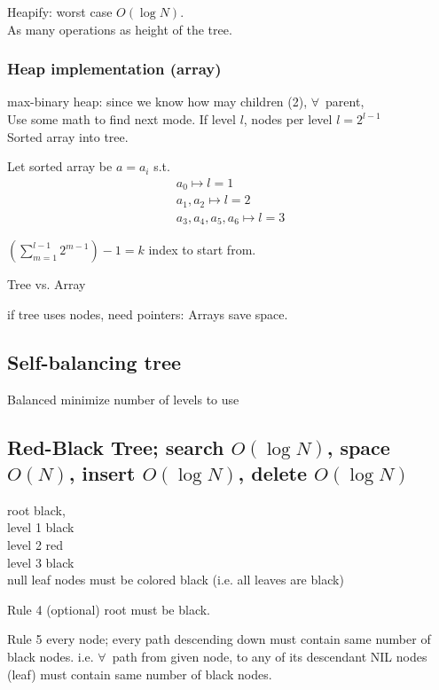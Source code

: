 \documentclass[10pt]{amsart}
\begin{document}
Heapify: worst case $O(\log{N})$. \\
As many operations as height of the tree.

\subsubsection{Heap implementation (array)}

max-binary heap: since we know how may children (2), $\forall \, $ parent, \\
Use some math to find next mode. If level $l$, nodes per level $l= 2^{l-1}$ \\
Sorted array into tree.

Let sorted array be $a=a_i$ s.t. 
\[
\begin{gathered} 
a_0 \mapsto l = 1\\ 
a_1, a_2 \mapsto l = 2 \\ 
a_3, a_4, a_5, a_6 \mapsto l = 3 
\end{gathered} 
\]

$\left(\sum_{m=1}^{l-1} 2^{m-1} \right) - 1 = k$ index to start from. 

Tree vs. Array

if tree uses nodes, need pointers: Arrays save space. 

\subsection{Self-balancing tree}

Balanced minimize number of levels to use

\subsection{Red-Black Tree; search $O(\log{N})$, space $O(N)$, insert $O(\log{N})$, delete $O(\log{N})$ }

root black, \\
level 1 black \\
level 2 red \\
level 3 black \\

null leaf nodes must be colored black (i.e. all leaves are black)

Rule 4 (optional) root must be black.

Rule 5 every node; every path descending down must contain same number of black nodes. i.e. $\forall\, $ path from given node, to any of its descendant NIL nodes (leaf) must contain same number of black nodes. 
\end{document}
